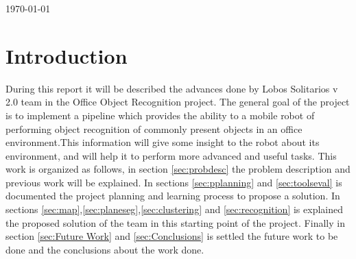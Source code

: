 \documentclass[fontsize=12pt]{article}
\begin{document}
\begin{titlepage}


{\large \today}\\[3cm] %


 

\vfill %

\end{titlepage}
\tableofcontents
\pagebreak[4]
\section{Introduction}\label{sec:intro}
During this report it will be described the advances done by Lobos Solitarios v 2.0 team in the Office Object Recognition project. The general goal of the project is to implement a pipeline which provides the ability to a mobile robot of performing object recognition of commonly present objects in an office environment.This information will give some insight to the robot about its environment, and will help it to perform more advanced and useful tasks. 
This work is organized as follows, in section \ref{sec:probdesc} the problem description and previous work will be explained. In sections  \ref{sec:pplanning} and \ref{sec:toolseval} is documented the project planning and learning process to propose a solution. In sections \ref{sec:map},\ref{sec:planeseg},\ref{sec:clustering} and \ref{sec:recognition} is explained the proposed solution of the team in this starting point of the project. Finally in section \ref{sec:Future Work} and \ref{sec:Conclusions} is settled the future work to be done and the conclusions about the work done.  
\end{document}

